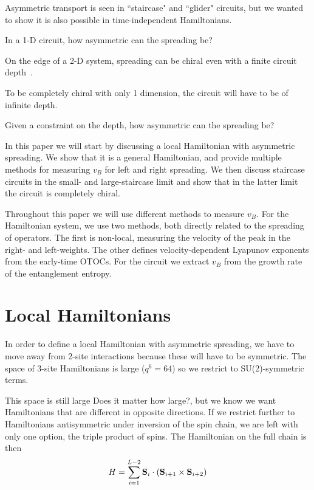 \documentclass[aps,prx,reprint,superscriptaddress, longbibliography]{revtex4-1}
\newcommand{\charlie}[1]{ {\color{Magenta} {{#1}}}}
\begin{document}
Asymmetric transport is seen in ``staircase" and ``glider" circuits, but we wanted to show it is also possible in time-independent Hamiltonians. 

In a 1-D circuit, how asymmetric can the spreading be?

On the edge of a 2-D system, spreading can be chiral even with a finite circuit depth~\cite{PoChiralCircuit}.

To be completely chiral with only 1 dimension, the circuit will have to be of infinite depth.

Given a constraint on the depth, how asymmetric can the spreading be?

In this paper we will start by discussing a local Hamiltonian with asymmetric spreading. We show that it is a general Hamiltonian, and provide multiple methods for measuring $v_B$ for left and right spreading. We then discuss staircase circuits in the small- and large-staircase limit and show that in the latter limit the circuit is completely chiral.

Throughout this paper we will use different methods to measure $v_B$. For the Hamiltonian system, we use two methods, both directly related to the spreading of operators. The first is non-local, measuring the velocity of the peak in the right- and left-weights. The other defines velocity-dependent Lyapunov exponents from the early-time OTOCs. For the circuit we extract $v_B$ from the growth rate of the entanglement entropy.

\tableofcontents

\section{Local Hamiltonians}

In order to define a local Hamiltonian with asymmetric spreading, we have to move away from 2-site interactions because these will have to be symmetric. The space of 3-site Hamiltonians is large ($q^{6} = 64$) so we restrict to SU(2)-symmetric terms.

This space is still large \charlie{Does it matter how large?}, but we know we want Hamiltonians that are different in opposite directions. If we restrict further to Hamiltonians antisymmetric under inversion of the spin chain, we are left with only one option, the triple product of spins. The Hamiltonian on the full chain is then
\begin{align}
H = \sum_{i=1}^{L-2}{\bf S}_i\cdot({\bf S}_{i+1}\times {\bf S}_{i+2})\nonumber
\end{align}
\end{document}
